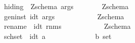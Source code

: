 \begin{isabellebody}
\ \ {\isachardoublequoteopen}{\isacharunderscore}hiding{\isachardoublequoteclose}\ {\isacharcolon}{\isacharcolon}\ {\isachardoublequoteopen}{\isacharbrackleft}Zschema{\isacharcomma}\ args{\isacharbrackright}\ \ \ \ \ \ \ {\isacharequal}{\isachargreater}\ Zschema{\isachardoublequoteclose}\ {\isacharparenleft}{\isachardoublequoteopen}{\isacharparenleft}{\isacharunderscore}{\isacharparenright}{\isacharbackslash}{\isacharbrackleft}{\isacharparenleft}{\isacharunderscore}{\isacharparenright}{\isacharbrackright}{\isachardoublequoteclose}\ \ \ \ {\isacharbrackleft}{}{}{\isacharcomma}{}{}{\isacharbrackright}{}{}{\isacharparenright}\isanewline
\ \ {\isachardoublequoteopen}{\isacharunderscore}geninst{\isachardoublequoteclose}{\isacharcolon}{\isacharcolon}\ {\isachardoublequoteopen}{\isacharbrackleft}idt{\isacharcomma}\ args{\isacharbrackright}\ \ \ \ \ \ \ \ \ \ \ {\isacharequal}{\isachargreater}\ Zschema{\isachardoublequoteclose}\ {\isacharparenleft}{\isachardoublequoteopen}{\isacharparenleft}{\isacharunderscore}{\isacharparenright}{\isacharbrackleft}{\isacharparenleft}{\isacharunderscore}{\isacharparenright}{\isacharbrackright}{\isachardoublequoteclose}\ \ \ \ \ \ {\isacharbrackleft}{}{}{\isacharcomma}{}{}{\isacharbrackright}{}{}{\isacharparenright}\isanewline
\ \ {\isachardoublequoteopen}{\isacharunderscore}rename{\isachardoublequoteclose}\ {\isacharcolon}{\isacharcolon}\ {\isachardoublequoteopen}{\isacharbrackleft}idt{\isacharcomma}\ rnms{\isacharbrackright}\ \ \ \ \ \ \ \ \ \ \ {\isacharequal}{\isachargreater}\ Zschema{\isachardoublequoteclose}\ {\isacharparenleft}{\isachardoublequoteopen}{\isacharparenleft}{\isacharunderscore}{\isacharparenright}{\isacharbackslash}{\isacharbrackleft}{\isacharparenleft}{\isacharunderscore}{\isacharparenright}{\isacharbrackright}{\isachardoublequoteclose}\ \ \ \ {\isacharbrackleft}{}{}{\isacharcomma}{}{}{\isacharbrackright}{}{}{\isacharparenright}\isanewline
\ \ {\isachardoublequoteopen}{\isacharunderscore}schset{\isachardoublequoteclose}\ {\isacharcolon}{\isacharcolon}\ {\isachardoublequoteopen}{\isacharbrackleft}idt{\isacharcomma}\ {\isacharprime}a{\isacharbrackright}\ \ \ \ \ \ \ \ \ \ \ \ \ {\isacharequal}{\isachargreater}\ {\isacharprime}b\ set{\isachardoublequoteclose}\ \ {\isacharparenleft}{\isachardoublequoteopen}{\isacharparenleft}{}{\isacharbraceleft}{\isachardot}{\isacharparenleft}{\isacharunderscore}{\isacharparenright}\ {\isacharat}\ {\isacharparenleft}{\isacharunderscore}{\isacharparenright}{\isachardot}{\isacharbraceright}{\isacharparenright}{\isachardoublequoteclose}{\isacharparenright}\isanewline

\end{isabellebody}
